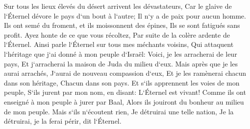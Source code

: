 \verse Sur tous les lieux élevés du désert arrivent les dévastateurs, Car le glaive de l`Éternel dévore le pays d`un bout à l`autre; Il n`y a de paix pour aucun homme. 
\verse Ils ont semé du froment, et ils moissonnent des épines, Ils se sont fatigués sans profit. Ayez honte de ce que vous récoltez, Par suite de la colère ardente de l`Éternel. 
\verse Ainsi parle l`Éternel sur tous mes méchants voisins, Qui attaquent l`héritage que j`ai donné à mon peuple d`Israël: Voici, je les arracherai de leur pays, Et j`arracherai la maison de Juda du milieu d`eux. 
\verse Mais après que je les aurai arrachés, J`aurai de nouveau compassion d`eux, Et je les ramènerai chacun dans son héritage, Chacun dans son pays. 
\verse Et s`ils apprennent les voies de mon peuple, S`ils jurent par mon nom, en disant: L`Éternel est vivant! Comme ils ont enseigné à mon peuple à jurer par Baal, Alors ils jouiront du bonheur au milieu de mon peuple. 
\verse Mais s`ils n`écoutent rien, Je détruirai une telle nation, Je la détruirai, je la ferai périr, dit l`Éternel. 

